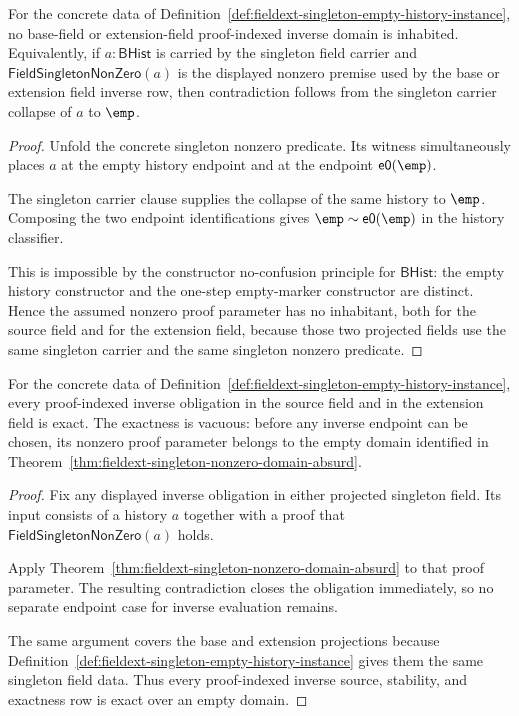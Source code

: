 \begin{theorem}
\label{thm:fieldext-singleton-nonzero-domain-absurd}
For the concrete data of
Definition~\ref{def:fieldext-singleton-empty-history-instance}, no base-field
or extension-field proof-indexed inverse domain is inhabited. Equivalently,
if $a:\mathsf{BHist}$ is carried by the singleton field carrier and
$\mathsf{FieldSingletonNonZero}(a)$ is the displayed nonzero premise used by
the base or extension field inverse row, then contradiction follows from the
singleton carrier collapse of $a$ to $\emp$.
\end{theorem}
\begin{proof}
Unfold the concrete singleton nonzero predicate. Its witness simultaneously
places $a$ at the empty history endpoint and at the endpoint
$\mathsf{e0}(\emp)$.

The singleton carrier clause supplies the collapse of the same history to
$\emp$. Composing the two endpoint identifications gives
$\emp \sim \mathsf{e0}(\emp)$ in the history classifier.

This is impossible by the constructor no-confusion principle for $\mathsf{BHist}$:
the empty history constructor and the one-step empty-marker constructor are
distinct. Hence the assumed nonzero proof parameter has no inhabitant, both
for the source field and for the extension field, because those two projected
fields use the same singleton carrier and the same singleton nonzero
predicate.
\end{proof}

\begin{theorem}
\label{thm:fieldext-singleton-inverse-row-vacuous-exactness}
For the concrete data of
Definition~\ref{def:fieldext-singleton-empty-history-instance}, every
proof-indexed inverse obligation in the source field and in the extension
field is exact. The exactness is vacuous: before any inverse endpoint can be
chosen, its nonzero proof parameter belongs to the empty domain identified in
Theorem~\ref{thm:fieldext-singleton-nonzero-domain-absurd}.
\end{theorem}
\begin{proof}
Fix any displayed inverse obligation in either projected singleton field. Its
input consists of a history $a$ together with a proof that
$\mathsf{FieldSingletonNonZero}(a)$ holds.

Apply Theorem~\ref{thm:fieldext-singleton-nonzero-domain-absurd} to that proof
parameter. The resulting contradiction closes the obligation immediately, so
no separate endpoint case for inverse evaluation remains.

The same argument covers the base and extension projections because
Definition~\ref{def:fieldext-singleton-empty-history-instance} gives them the
same singleton field data. Thus every proof-indexed inverse source,
stability, and exactness row is exact over an empty domain.
\end{proof}

